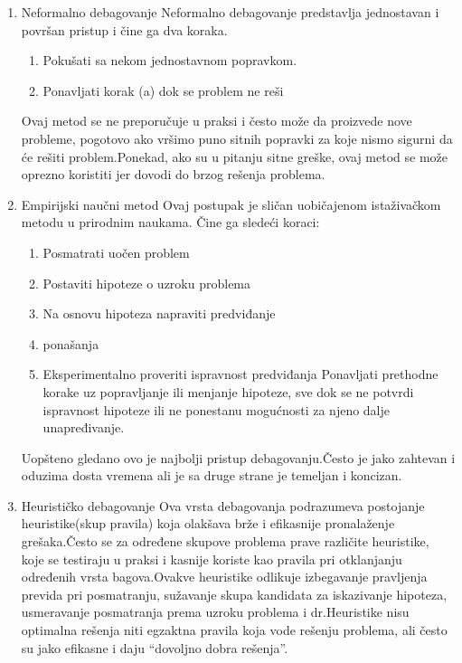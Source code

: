 \documentclass[a4paper]{article}
\begin{document}
\begin{enumerate}
	\item Neformalno debagovanje
	Neformalno debagovanje predstavlja jednostavan i površan pristup i čine ga dva koraka.
	\begin{enumerate}
		\item Pokušati sa nekom jednostavnom popravkom.
		\item Ponavljati korak (a) dok se problem ne reši
	\end{enumerate}
	Ovaj metod se ne preporučuje u praksi i često može da proizvede nove probleme, pogotovo ako vršimo puno sitnih popravki za koje nismo sigurni da će rešiti problem.Ponekad, ako su u pitanju sitne greške, ovaj metod se može oprezno koristiti jer dovodi do brzog rešenja problema.
	
	\item Empirijski naučni metod
	Ovaj postupak je sličan uobičajenom istaživačkom metodu u prirodnim naukama.
	Čine ga sledeći koraci:
	\begin{enumerate}
		\item Posmatrati uočen problem
		\item Postaviti hipoteze o uzroku problema
		\item Na osnovu hipoteza napraviti predviđanje \item ponašanja
		\item Eksperimentalno proveriti ispravnost predviđanja
		Ponavljati prethodne korake uz popravljanje ili menjanje hipoteze, sve dok se ne potvrdi ispravnost hipoteze ili ne ponestanu mogućnosti za njeno dalje unapređivanje. 
	\end{enumerate}
	\indent Uopšteno gledano ovo je najbolji pristup debagovanju.Često je jako zahtevan i oduzima dosta vremena ali je sa druge strane je temeljan i koncizan.
	
	
	\item Heurističko debagovanje
	Ova vrsta debagovanja podrazumeva postojanje heuristike(skup pravila) koja olakšava brže i efikasnije pronalaženje grešaka.Često se za određene skupove problema prave različite heuristike, koje se testiraju u praksi i kasnije koriste kao pravila pri otklanjanju određenih vrsta bagova.Ovakve heuristike odlikuje izbegavanje pravljenja previda pri posmatranju, sužavanje skupa kandidata za iskazivanje hipoteza, usmeravanje posmatranja prema uzroku problema i dr.Heuristike nisu optimalna rešenja niti egzaktna pravila koja vode rešenju problema, ali često su jako efikasne i daju “dovoljno dobra rešenja”.
\end{enumerate}
\end{document}
